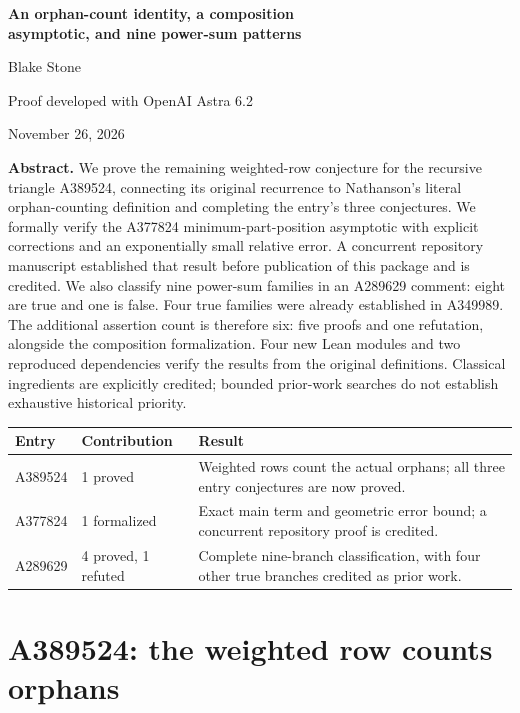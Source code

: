 \documentclass[11pt]{article}
\begin{document}
\begin{center}
{\LARGE\bfseries An orphan-count identity, a composition\\[3pt]
asymptotic, and nine power-sum patterns}\par
\vspace{0.5em}
{\large Blake Stone}\par
Proof developed with OpenAI Astra 6.2\par
November 26, 2026
\end{center}

\textbf{Abstract.}
We prove the remaining weighted-row conjecture for the recursive triangle
A389524, connecting its original recurrence to Nathanson's literal
orphan-counting definition and completing the entry's three conjectures.
We formally verify the A377824 minimum-part-position asymptotic with
explicit corrections and an exponentially small relative error. A concurrent
repository manuscript established that result before publication of this
package and is credited. We also classify nine power-sum families in an
A289629 comment: eight are true and one is false. Four true families were
already established in A349989. The additional assertion count is therefore
six: five proofs and one refutation, alongside the composition formalization.
Four new Lean modules and two reproduced dependencies verify the results
from the original definitions. Classical ingredients are explicitly credited;
bounded prior-work searches do not establish exhaustive historical priority.

\begin{center}
\begin{tabular}{@{}ll>{\raggedright\arraybackslash}p{3.7in}@{}}
\toprule
Entry & Contribution & Result\\
\midrule
A389524 & 1 proved & Weighted rows count the actual orphans; all three entry conjectures are now proved.\\
A377824 & 1 formalized & Exact main term and geometric error bound; a concurrent repository proof is credited.\\
A289629 & 4 proved, 1 refuted & Complete nine-branch classification, with four other true branches credited as prior work.\\
\bottomrule
\end{tabular}
\end{center}

\section{A389524: the weighted row counts orphans}
\end{document}
